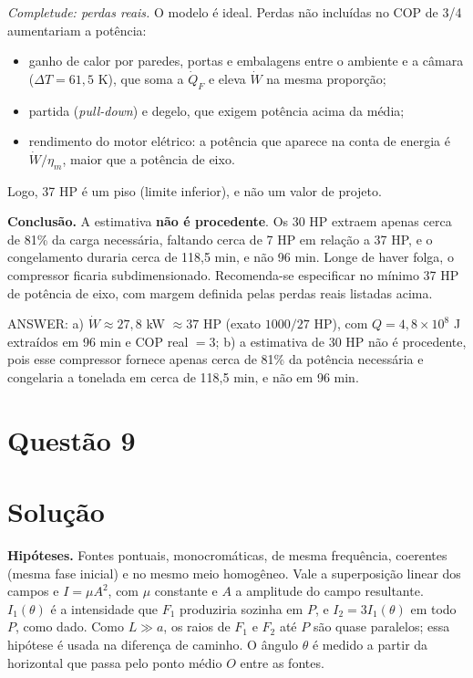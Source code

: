 \documentclass{article}%
\begin{document}
\textit{Completude: perdas reais.} O modelo é ideal. Perdas não incluídas no COP de 3/4 aumentariam a potência:
\begin{itemize}
\item ganho de calor por paredes, portas e embalagens entre o ambiente e a câmara ($\Delta T = 61{,}5$ K), que soma a $\dot Q_F$ e eleva $\dot W$ na mesma proporção;
\item partida (\emph{pull-down}) e degelo, que exigem potência acima da média;
\item rendimento do motor elétrico: a potência que aparece na conta de energia é $\dot W/\eta_m$, maior que a potência de eixo.
\end{itemize}
Logo, 37 HP é um piso (limite inferior), e não um valor de projeto.

\textbf{Conclusão.} A estimativa \textbf{não é procedente}. Os 30 HP extraem apenas cerca de 81\% da carga necessária, faltando cerca de 7 HP em relação a 37 HP, e o congelamento duraria cerca de 118,5 min, e não 96 min. Longe de haver folga, o compressor ficaria subdimensionado. Recomenda-se especificar no mínimo 37 HP de potência de eixo, com margem definida pelas perdas reais listadas acima.

ANSWER: a) $\dot W \approx 27{,}8$ kW $\approx 37$ HP (exato $1000/27$ HP), com $Q = 4{,}8\times10^{8}$ J extraídos em 96 min e COP real $= 3$; b) a estimativa de 30 HP não é procedente, pois esse compressor fornece apenas cerca de 81\% da potência necessária e congelaria a tonelada em cerca de 118,5 min, e não em 96 min.%
\newpage%
\section*{Questão 9}

\section*{Solução}

\textbf{Hipóteses.} Fontes pontuais, monocromáticas, de mesma frequência, coerentes (mesma fase inicial) e no mesmo meio homogêneo. Vale a superposição linear dos campos e $I=\mu A^2$, com $\mu$ constante e $A$ a amplitude do campo resultante. $I_1(\theta)$ é a intensidade que $F_1$ produziria sozinha em $P$, e $I_2=3I_1(\theta)$ em todo $P$, como dado. Como $L\gg a$, os raios de $F_1$ e $F_2$ até $P$ são quase paralelos; essa hipótese é usada na diferença de caminho. O ângulo $\theta$ é medido a partir da horizontal que passa pelo ponto médio $O$ entre as fontes.
\end{document}
